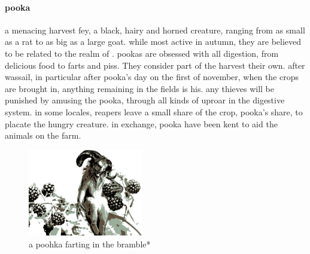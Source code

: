 \paragraph{pooka} a menacing harvest fey, a black, hairy and horned creature, ranging from as small as a rat to as big as a large goat. while most active in autumn, they are believed to be related to the realm of . pookas are obsessed with all digestion, from delicious food to farts and piss. They consider part of the harvest their own. after wassail, in particular after pooka's day on the first of november, when the crops are brought in, anything remaining in the fields is his. any thieves will be punished by amusing the pooka, through all kinds of uproar in the digestive system. in some locales, reapers leave a small share of the crop, pooka's share, to placate the hungry creature. in exchange, pooka have been kent to aid the animals on the farm. \begin{figure}\centering\includegraphics[width=5cm]{encyclopedia/pooka.png}\caption{a poohka farting in the bramble*}\end{figure}
